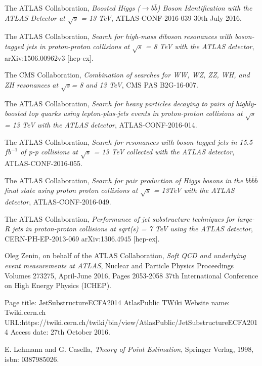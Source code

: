 \documentclass[UKenglish,texlive=2013]{\ATLASLATEXPATH atlasdoc}
\newcommand{\cme}{\sqrt{s}}
\begin{document}
\begin{thebibliography}{9}
The ATLAS Collaboration,
\emph{Boosted Higgs ($\to b\bar{b}$) Boson Identification with the ATLAS
Detector at $\cme$ = 13 TeV},
ATLAS-CONF-2016-039
30th July 2016.

The ATLAS Collaboration,
\emph{Search for high-mass diboson resonances with boson-tagged jets in proton-proton collisions at $\cme$ = 8 TeV with the ATLAS detector},
arXiv:1506.00962v3 [hep-ex].

The CMS Collaboration,
\emph{Combination of searches for WW, WZ, ZZ, WH, and ZH
resonances at $\cme$= 8 and 13 TeV},
CMS PAS B2G-16-007.

The ATLAS Collaboration,
\emph{Search for heavy particles decaying to pairs of highly-boosted top
quarks using lepton-plus-jets events in proton-proton collisions at
$\cme$ = 13 TeV with the ATLAS detector},
ATLAS-CONF-2016-014.

The ATLAS Collaboration,
\emph{Search for resonances with boson-tagged jets in 15.5 $fb^{-1}$ of p-p
collisions at $\cme$ = 13 TeV collected with the ATLAS detector},
ATLAS-CONF-2016-055.

The ATLAS Collaboration,
\emph{Search for pair production of Higgs bosons in the $bb\bar{b}\bar{b}$ final state
using proton proton collisions at $\cme$ = 13TeV with the ATLAS detector},
ATLAS-CONF-2016-049.

The ATLAS Collaboration,
\emph{Performance of jet substructure techniques for large-R jets in proton-proton collisions at sqrt(s) = 7 TeV using the ATLAS detector},
CERN-PH-EP-2013-069
arXiv:1306.4945 [hep-ex].

Oleg Zenin, on behalf of the ATLAS Collaboration,
\emph{Soft QCD and underlying event measurements at ATLAS},
Nuclear and Particle Physics Proceedings
Volumes 273275, April-June 2016, Pages 2053-2058
37th International Conference on High Energy Physics (ICHEP).

Page title: JetSubstructureECFA2014 AtlasPublic TWiki
Website name: Twiki.cern.ch
URL:https://twiki.cern.ch/twiki/bin/view/AtlasPublic/JetSubstructureECFA2014
Access date: 27th October 2016.

E. Lehmann and G. Casella,
\emph{Theory of Point Estimation},
Springer Verlag, 1998,
isbn: 0387985026.

\end{thebibliography}
\printbibliography
%
%
\end{document}
